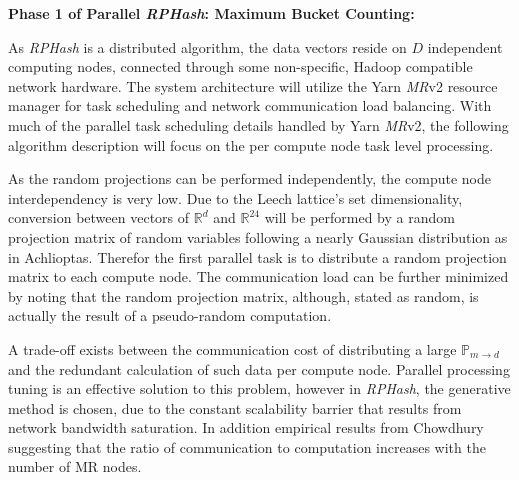 \documentclass[a4paper,10pt]{article}
\begin{document}
\textbf{Phase 1 of Parallel \emph{RPHash}: Maximum Bucket Counting:}

As \emph{RPHash} is a distributed algorithm, the data vectors reside on
$D$ independent computing nodes, connected through some non-specific,
Hadoop\cite{hadoop} compatible network hardware.  The system architecture
will utilize the Yarn \emph{MR}v2 resource manager for task scheduling and
network communication load balancing. With much of the parallel task scheduling
 details handled by Yarn \emph{MR}v2, the following algorithm description will
focus on the per compute node task level processing.  

As the random projections can
be performed independently, the compute node interdependency is very low.
Due to the Leech lattice's set dimensionality, conversion between vectors of
$\mathbb{R}^d$ and $\mathbb{R}^{24}$  will be performed by a random projection
matrix of random variables following a nearly Gaussian distribution as in
Achlioptas\cite{Achlioptas01}.  Therefor the first parallel task is to 
distribute a random projection matrix to each compute node.  The communication 
load can be further minimized by noting that the random projection matrix,
although, stated as random, is actually the result of a pseudo-random 
computation.

A trade-off exists between the communication cost of distributing a large
$\mathbb{P}_{m\rightarrow d}$ and the redundant calculation of such data
per compute node.  Parallel processing tuning is an effective solution to
this problem, however in \emph{RPHash}, the generative method is chosen,
due to the constant scalability barrier that results from network bandwidth
saturation. In addition empirical results from Chowdhury\cite{chowdhury} 
suggesting
that the ratio of communication to computation increases with the number of
MR nodes.  
\end{document}
